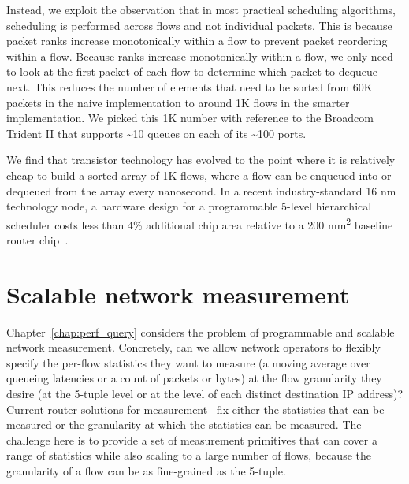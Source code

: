 Instead, we exploit the observation that in most practical scheduling
algorithms, scheduling is performed across flows and not individual packets.
This is because packet ranks increase monotonically within a flow to prevent
packet reordering within a flow. Because ranks increase monotonically within a
flow, we only need to look at the first packet of each flow to determine which
packet to dequeue next. This reduces the number of elements that need to be
sorted from 60K packets in the naive implementation to around 1K flows in the
smarter implementation. We picked this 1K number with reference to the Broadcom
Trident II that supports \textasciitilde10 queues on each of its
\textasciitilde100 ports.

We find that transistor technology has evolved to the point where it is
relatively cheap to build a sorted array of 1K flows, where a flow can be
enqueued into or dequeued from the array every nanosecond. In a recent
industry-standard 16 nm technology node, a hardware design for a programmable
5-level hierarchical scheduler costs less than 4\% additional chip area
relative to a 200 \si{\milli\meter\squared} baseline router
chip~\cite{glen_parsing}.

\section{Scalable network measurement}
Chapter~\ref{chap:perf_query} considers the problem of programmable and
scalable network measurement. Concretely, can we allow network operators to
flexibly specify the per-flow statistics they want to measure (\eg a moving
average over queueing latencies or a count of packets or bytes) at the flow
granularity they desire (\eg at the 5-tuple level or at the level of each
distinct destination IP address)? Current router solutions for
measurement~\cite{netflow, tetration-telemetry} fix either the statistics that
can be measured or the granularity at which the statistics can be measured. The
challenge here is to provide a set of measurement primitives that can cover a
range of statistics while also scaling to a large number of flows, because the
granularity of a flow can be as fine-grained as the 5-tuple.


